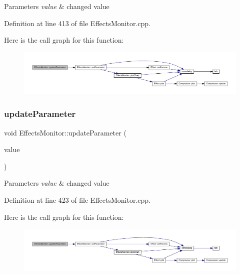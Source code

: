 \begin{DoxyParams}{Parameters}
{\em value} & changed value \\
\hline
\end{DoxyParams}


Definition at line 413 of file Effects\+Monitor.\+cpp.

Here is the call graph for this function\+:
\nopagebreak
\begin{figure}[H]
\begin{center}
\leavevmode
\includegraphics[width=350pt]{class_effects_monitor_aa32c90185185305770ad5ab911641e17_cgraph}
\end{center}
\end{figure}
\mbox{\label{class_effects_monitor_ab2be23fba9628432cacdfc83cc75e9f4}} 
\subsubsection{\texorpdfstring{update\+Parameter}{updateParameter}\hspace{0.1cm}{\footnotesize\ttfamily [3/4]}}
{\footnotesize\ttfamily void Effects\+Monitor\+::update\+Parameter (\begin{DoxyParamCaption}\item[{Q\+String}]{value }\end{DoxyParamCaption})\hspace{0.3cm}{\ttfamily [slot]}}


\begin{DoxyParams}{Parameters}
{\em value} & changed value \\
\hline
\end{DoxyParams}


Definition at line 423 of file Effects\+Monitor.\+cpp.

Here is the call graph for this function\+:
\nopagebreak
\begin{figure}[H]
\begin{center}
\leavevmode
\includegraphics[width=350pt]{class_effects_monitor_ab2be23fba9628432cacdfc83cc75e9f4_cgraph}
\end{center}
\end{figure}
\mbox{\label{class_effects_monitor_a3488d6ae49a81de79fe6913a7bebcafe}} 
